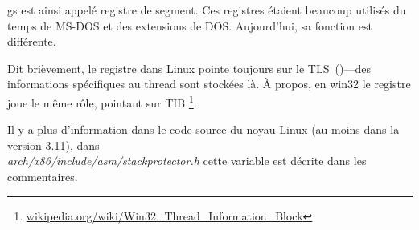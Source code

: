 gs est ainsi appelé registre de segment. Ces registres étaient beaucoup utilisés
du temps de MS-DOS et des extensions de DOS.
Aujourd'hui, sa fonction est différente.

Dit brièvement, le registre  dans Linux pointe toujours sur le
\ac{TLS}~()---des informations spécifiques au thread sont stockées là.
À propos, en win32 le registre  joue le même rôle, pointant sur \ac{TIB}
\footnote{\href{https://en.wikipedia.org/wiki/Win32_Thread_Information_Block}{wikipedia.org/wiki/Win32\_Thread\_Information\_Block}}.

Il y a plus d'information dans le code source du noyau Linux (au moins dans la version 3.11),
dans\\
\emph{arch/x86/include/asm/stackprotector.h} cette variable est décrite dans les commentaires.



